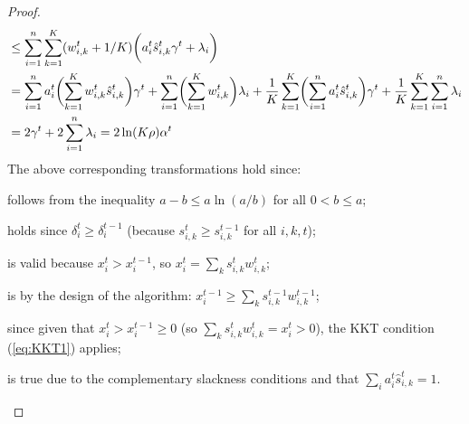 \begin{proof}
\begin{align}
%
%
&\leq \sum_{i=1}^{n} \sum_{k=1}^{K} (w_{i,k}^{t} + 1/K) \biggl( a_{i}^{t} \hat{s}_{i,k}^{t} \gamma^t + \lambda_{i} \biggr) \notag \\
%
&= \sum_{i=1}^{n} a_{i}^{t} \biggl(\sum_{k=1}^{K} w_{i,k}^{t} \hat{s}_{i,k}^{t} \biggr) \gamma^t + \sum_{i=1}^{n} \biggl( \sum_{k=1}^{K} w_{i,k}^{t} \biggr) \lambda_{i}
+ \frac{1}{K}  \sum_{k=1}^{K} \biggl( \sum_{i=1}^{n} a_{i}^{t}  \hat{s}_{i,k}^{t}  \biggr) \gamma^t + \frac{1}{K} \sum_{k=1}^{K} \sum_{i=1}^{n} \lambda_{i} 		\notag \\
%
&= 2 \gamma^{t} + 2\sum_{i=1}^{n} \lambda_{i} = 2\ln(K \rho) \alpha^{t}
\end{align}
%
The above corresponding transformations hold since:
\begin{compactenum}[(1)]
	\setcounter{enumi}{1}
	\item follows from the inequality $a - b \leq a \ln(a/b)$ for all $0 < b \leq a$;
	\item holds since $\delta_{i}^{t} \geq \delta_{i}^{t-1}$ (because $s_{i,k}^{t} \geq s_{i,k}^{t-1}$ for all $i,k,t$);
	\item is valid because $x_{i}^{t} > x_{i}^{t-1}$, so $x_{i}^{t} = \sum_{k}  s_{i,k}^{t} w_{i,k}^{t}$;
	\item is by the design of the algorithm: $x_{i}^{t-1} \geq \sum_{k}  s_{i,k}^{t-1} w_{i,k}^{t-1}$;
	\setcounter{enumi}{5}
	\item since given that $x_{i}^{t} > x_{i}^{t-1} \geq 0$
	(so $\sum_{k}  s_{i,k}^{t} w_{i,k}^{t} = x_{i}^{t} > 0$), the KKT condition (\ref{eq:KKT1}) applies;
	\item is true due to the complementary slackness conditions
		and that $\sum_{i} a_{i}^{t}  \hat{s}_{i,k}^{t} = 1$.
\end{compactenum}
\end{proof}

